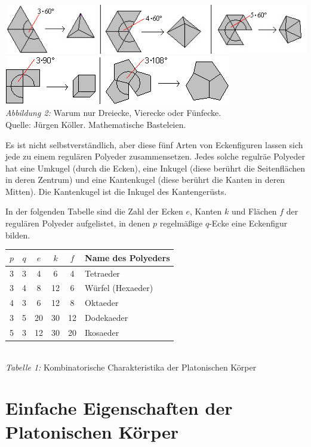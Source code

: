 \documentclass[11pt]{article}
\begin{document}
\begin{center}
  \includegraphics[width=.8\textwidth]{graebe-05-1/winkel-1.jpg}\\
  \includegraphics[width=.6\textwidth]{graebe-05-1/winkel-2.jpg}\\
  \emph{Abbildung 2:} Warum nur Dreiecke, Vierecke oder Fünfecke.\\ Quelle:
  Jürgen Köller. Mathematische Basteleien. \cite{KoellerPlatonisch}
\end{center}

Es ist nicht selbstverständlich, aber diese fünf Arten von Eckenfiguren lassen
sich jede zu einem regulären Polyeder zusammensetzen.  Jedes solche regulräe
Polyeder hat eine Umkugel (durch die Ecken), eine Inkugel (diese berührt die
Seitenflächen in deren Zentrum) und eine Kantenkugel (diese berührt die Kanten
in deren Mitten).  Die Kantenkugel ist die Inkugel des Kantengerüsts.

In der folgenden Tabelle sind die Zahl der Ecken $e$, Kanten $k$ und Flächen
$f$ der regulären Polyeder aufgelistet, in denen $p$ regelmäßige $q$-Ecke eine
Eckenfigur bilden.
\begin{center}
  \begin{tabular}{|cc|ccc|l|}\hline
    $p$ & $q$ & $e$ & $k$ & $f$ & Name des Polyeders \\\hline
    3 & 3 &  4 &  6 &  4 & Tetraeder\\
    3 & 4 &  8 & 12 &  6 & Würfel (Hexaeder)\\
    4 & 3 &  6 & 12 &  8 & Oktaeder\\
    3 & 5 & 20 & 30 & 12 & Dodekaeder\\
    5 & 3 & 12 & 30 & 20 & Ikosaeder\\\hline
  \end{tabular}\\[6pt]
  \emph{Tabelle 1:} Kombinatorische Charakteristika der Platonischen Körper
\end{center}

\section*{Einfache Eigenschaften der Platonischen Körper}
\end{document}
